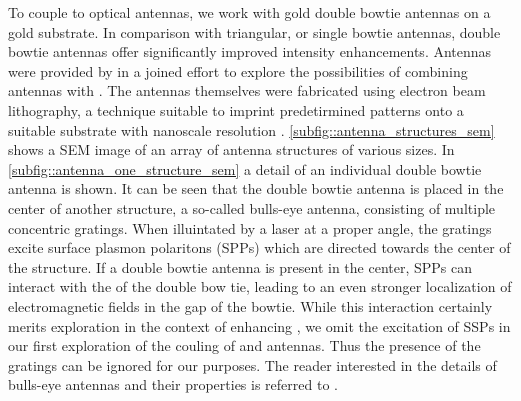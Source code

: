 		 To couple \sivs to optical antennas, we work with gold double bowtie antennas on a gold substrate. In comparison with triangular, or single bowtie antennas, double bowtie antennas offer significantly improved intensity enhancements. Antennas were provided by \nancy in a joined effort to explore the possibilities of combining antennas with \sivs. The antennas themselves were fabricated using electron beam lithography, a technique suitable to imprint predetirmined patterns onto a suitable substrate with nanoscale resolution \cite{nancy::232}. \autoref{subfig::antenna_structures_sem} shows a SEM image of an array of antenna structures of various sizes. In \autoref{subfig::antenna_one_structure_sem} a detail of an individual double bowtie antenna is shown. It can be seen that the double bowtie antenna is placed in the center of another structure, a so-called bulls-eye antenna, consisting of multiple concentric gratings. When illuintated by a laser at a proper angle, the gratings excite surface plasmon polaritons (SPPs) which are directed towards the center of the structure. If a double bowtie antenna is present in the center, SPPs can interact with the \LSPs of the double bow tie, leading to an even stronger localization of electromagnetic fields in the gap of the bowtie. While this interaction certainly merits exploration in the context of enhancing \sivs, we omit the excitation of SSPs in our first exploration of the couling of \sivs and antennas. Thus the presence of the gratings can be ignored for our purposes. The reader interested in the details of bulls-eye antennas and their properties is referred to \cite{nancy::thesis}.

